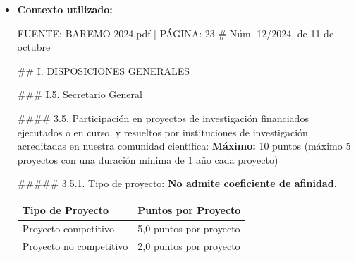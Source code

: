 \documentclass{article}
\begin{document}
\begin{itemize}
\begin{itemize}
                Para obtener la puntuación máxima en Bareprof, es importante tener en cuenta los siguientes aspectos:

                * La participación como Investigador Principal (IP) en proyectos de investigación competitivos se valora con un máximo de 10 puntos.
                * El número máximo de proyectos que se pueden valorar es de 5, con una duración mínima de 1 año cada proyecto.
                * La puntuación se calcula multiplicando el número de puntos por proyecto por los complementos correspondientes (ámbito geográfico, duración y grado de contribución).

                Es importante destacar que la comisión de evaluación tendrá en cuenta la documentación acreditativa presentada por el candidato y podrá solicitar información adicional para confirmar la veracidad de los méritos alegados.
          \item \textbf{Contexto utilizado:}
                \begin{scriptsize}
                  FUENTE: BAREMO 2024.pdf | PÁGINA: 23
                  \# Núm. 12/2024, de 11 de octubre

                  \#\# I. DISPOSICIONES GENERALES

                  \#\#\# I.5. Secretario General

                  \#\#\#\# 3.5. Participación en proyectos de investigación
                  financiados ejecutados o en curso, y resueltos por instituciones de investigación acreditadas en nuestra comunidad científica:
                  \textbf{Máximo:} 10 puntos
                  (máximo 5 proyectos con una duración mínima de 1 año cada proyecto)

                  \#\#\#\#\# 3.5.1. Tipo de proyecto:
                  \textbf{No admite coeficiente de afinidad.}

                  \vspace{0.4cm}
                  \begin{table}[h!]\centering\renewcommand{\arraystretch}{1.3}
                    \begin{tabular}{|p{}|p{}|}\hline
                      Tipo de Proyecto        & Puntos por Proyecto     \\\hline
                      Proyecto competitivo    & 5,0 puntos por proyecto \\\hline
                      Proyecto no competitivo & 2,0 puntos por proyecto \\\hline
                    \end{tabular}\end{table}
                  \vspace{0.4cm}


\end{scriptsize}
\end{itemize}
\end{itemize}
\end{document}
